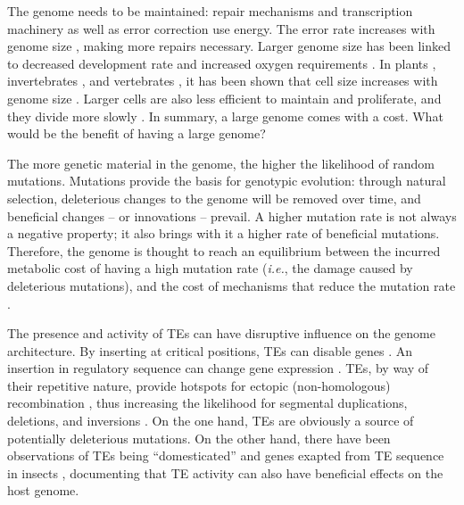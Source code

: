 The genome needs to be maintained: repair mechanisms and transcription
machinery as well as error correction use energy. The error rate
increases with genome size \citep{Wielgoss2011}, making more repairs
necessary. Larger genome size has been linked to decreased development
rate \citep{White2000} and increased oxygen requirements
\citep{Vinogradov1997, Gregory2002}. In plants \citep{Grime1983},
invertebrates \citep{Gregory2005}, and vertebrates \citep{Horner1983,
Olmo1982, Gregory2000}, it has been shown that cell size increases with
genome size \citep{Dufresne2011}. Larger cells are also less efficient to
maintain and proliferate, and they divide more slowly
\citep{Bennett1977}. In summary, a large genome comes with a cost. What
would be the benefit of having a large genome?

The more genetic material in the genome, the higher the likelihood of
random mutations. Mutations provide the basis for genotypic evolution:
through natural selection, deleterious changes to the genome will be
removed over time, and beneficial changes -- or innovations -- prevail.
A higher mutation rate is not always a negative property; it also brings
with it a higher rate of beneficial mutations. Therefore, the genome is
thought to reach an equilibrium between the incurred metabolic cost of
having a high mutation rate (\emph{i.e.}, the damage caused by
deleterious mutations), and the cost of mechanisms that reduce the
mutation rate \citep{Bernstein1987, Altenberg2011}.

The presence and activity of TEs can have disruptive influence on the
genome architecture. By inserting at critical positions, TEs can disable
genes \citep{Kazazian1988}. An insertion in regulatory sequence can
change gene expression \citep{Warnefors2010}. TEs, by way of their
repetitive nature, provide hotspots for ectopic (non-homologous)
recombination \citep{Lim1988, Gray2000, Fiston-Lavier2007}, thus
increasing the likelihood for segmental duplications, deletions, and
inversions \citep{Mathiopoulos1998, Remnant2013}. On the one hand, TEs
are obviously a source of potentially deleterious mutations. On the
other hand, there have been observations of TEs being ``domesticated''
and genes exapted from TE sequence in insects \citep{Gahan2001,
Daborn2002, Aminetzach2005, Chen2007}, documenting that TE activity can
also have beneficial effects on the host genome.

